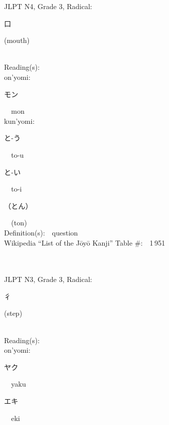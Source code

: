 \begin{multicols}{2}
{JLPT N4, Grade 3, Radical:\ \ {\begin{CJK}{UTF8}{min} 口 \end{CJK}} (mouth) } \\
Reading(s):\ \ \\
{\hspace*{1em}}on'yomi:\ \ \\
{\hspace*{2em}}{\begin{CJK}{UTF8}{min} モン \end{CJK}}\ \ mon\ \ \\
{\hspace*{1em}}kun'yomi:\ \ \\
{\hspace*{2em}}{\begin{CJK}{UTF8}{min} と-う \end{CJK}}\ \ to-u\ \ \\
{\hspace*{2em}}{\begin{CJK}{UTF8}{min} と-い \end{CJK}}\ \ to-i\ \ \\
{\hspace*{2em}}{\begin{CJK}{UTF8}{min} （とん） \end{CJK}}\ \ (ton)\ \ \\
Definition(s):\ \ question \\
Wikipedia ``List of the J\=oy\=o Kanji'' Table \#:\ \ 1\,951 \\
\ \ \\
{\fontsize{34pt}{40pt}  }\ \ \\  %
{JLPT N3, Grade 3, Radical:\ \ {\begin{CJK}{UTF8}{min} 彳 \end{CJK}} (step) } \\
Reading(s):\ \ \\
{\hspace*{1em}}on'yomi:\ \ \\
{\hspace*{2em}}{\begin{CJK}{UTF8}{min} ヤク \end{CJK}}\ \ yaku\ \ \\
{\hspace*{2em}}{\begin{CJK}{UTF8}{min} エキ \end{CJK}}\ \ eki\ \ \\

\end{multicols}

